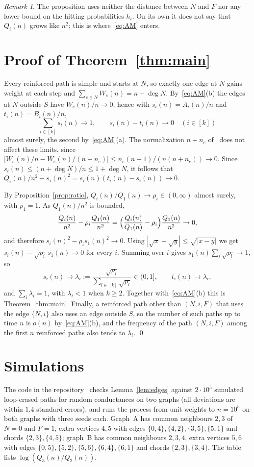 \documentclass[11pt]{amsart}
\theoremstyle{remark}
\newtheorem{remark}[theorem]{Remark}
\begin{document}
\begin{remark}
The proposition uses neither the distance between $N$ and $F$ nor any lower bound on the hitting probabilities $h_i$.
On its own it does not say that $Q_i(n)$ grows like $n^2$; this is where~\eqref{eq:AM} enters.
\end{remark}

\section{Proof of Theorem~\ref{thm:main}}\label{sec:proof}

Every reinforced path is simple and starts at $N$, so exactly one edge at $N$ gains weight at each step and
$\sum_{e\ni N}W_e(n)=n+\deg N$. By~\eqref{eq:AM}(b) the edges at $N$ outside $S$ have $W_e(n)/n\to0$, hence with
$s_i(n)=A_i(n)/n$ and $t_i(n)=B_i(n)/n$,
\[
\sum_{i\in[k]}s_i(n)\to1,\qquad s_i(n)-t_i(n)\to0\quad(i\in[k])
\]
almost surely, the second by~\eqref{eq:AM}(a). The normalization $n+n_e$ of~\cite{AM} does not affect these limits,
since $|W_e(n)/n-W_e(n)/(n+n_e)|\le n_e(n+1)/(n(n+n_e))\to0$.
Since $s_i(n)\le(n+\deg N)/n\le1+\deg N$, it follows that $Q_i(n)/n^2-s_i(n)^2=s_i(n)(t_i(n)-s_i(n))\to0$.

By Proposition~\ref{prop:ratio}, $Q_i(n)/Q_1(n)\to\rho_i\in(0,\infty)$ almost surely, with $\rho_1=1$. As $Q_1(n)/n^2$ is
bounded,
\[
\frac{Q_i(n)}{n^2}-\rho_i\frac{Q_1(n)}{n^2}=\Bigl(\frac{Q_i(n)}{Q_1(n)}-\rho_i\Bigr)\frac{Q_1(n)}{n^2}\to0,
\]
and therefore $s_i(n)^2-\rho_is_1(n)^2\to0$. Using $|\sqrt x-\sqrt y|\le\sqrt{|x-y|}$ we get
$s_i(n)-\sqrt{\rho_i}\,s_1(n)\to0$ for every $i$. Summing over $i$ gives $s_1(n)\sum_l\sqrt{\rho_l}\to1$, so
\[
s_i(n)\to\lambda_i:=\frac{\sqrt{\rho_i}}{\sum_{l\in[k]}\sqrt{\rho_l}}\in(0,1],\qquad t_i(n)\to\lambda_i,
\]
and $\sum_i\lambda_i=1$, with $\lambda_i<1$ when $k\ge2$. Together with~\eqref{eq:AM}(b) this is
Theorem~\ref{thm:main}. Finally, a reinforced path other than $(N,i,F)$ that uses the edge $\{N,i\}$ also uses an edge
outside $S$, so the number of such paths up to time $n$ is $o(n)$ by~\eqref{eq:AM}(b), and the frequency of the path
$(N,i,F)$ among the first $n$ reinforced paths also tends to $\lambda_i$. \qed

\section{Simulations}\label{sec:numerics}

The code in the repository~\cite{Repo} checks Lemma~\ref{lem:edges} against $2\cdot10^5$ simulated loop-erased paths
for random conductances on two graphs (all deviations are within $1.4$ standard errors), and runs the process from unit
weights to $n=10^5$ on both graphs with three seeds each. Graph~A has common neighbours $2,3$ of $N=0$ and $F=1$, extra
vertices $4,5$ with edges $\{0,4\},\{4,2\},\{3,5\},\{5,1\}$ and chords $\{2,3\},\{4,5\}$; graph~B has common neighbours
$2,3,4$, extra vertices $5,6$ with edges $\{0,5\},\{5,2\},\{5,6\},\{6,4\},\{6,1\}$ and chords $\{2,3\},\{3,4\}$. The
table lists $\log(Q_3(n)/Q_2(n))$.
\end{document}

